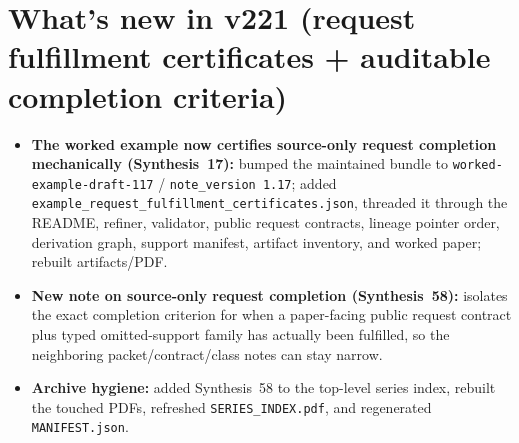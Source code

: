 \documentclass[11pt]{article}
\begin{document}
\section{What's new in v221 (request fulfillment certificates + auditable completion criteria)}
\begin{itemize}[leftmargin=*]
\item \textbf{The worked example now certifies source-only request completion mechanically (Synthesis~17):} bumped the maintained bundle to \texttt{worked-example-draft-117} / \texttt{note\_version 1.17}; added \texttt{example\_request\_fulfillment\_certificates.json}, threaded it through the README, refiner, validator, public request contracts, lineage pointer order, derivation graph, support manifest, artifact inventory, and worked paper; rebuilt artifacts/PDF.
\item \textbf{New note on source-only request completion (Synthesis~58):} isolates the exact completion criterion for when a paper-facing public request contract plus typed omitted-support family has actually been fulfilled, so the neighboring packet/contract/class notes can stay narrow.
\item \textbf{Archive hygiene:} added Synthesis~58 to the top-level series index, rebuilt the touched PDFs, refreshed \texttt{SERIES\_INDEX.pdf}, and regenerated \texttt{MANIFEST.json}.
\end{itemize}
\end{document}
